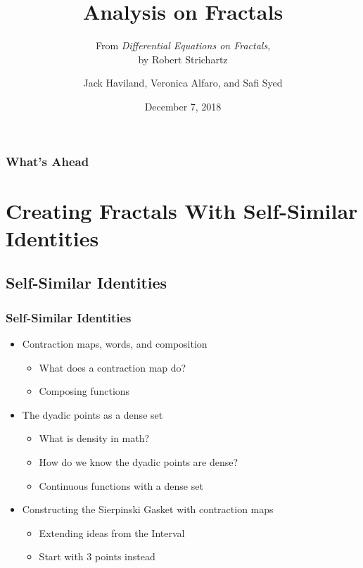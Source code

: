 \documentclass{beamer}
\title{Analysis on Fractals}
\subtitle{From \textit{Differential Equations on Fractals}, \\ by Robert Strichartz}
\author[Jack H, Veronica A, Safi S]{Jack Haviland, Veronica Alfaro, and Safi Syed}
\institute[]{Honors 135.004\\Fractals: Their Beauty and Topology\\Connor Davis}
\date{December 7, 2018}
\begin{document}
\begin{frame}
	\titlepage
\end{frame}

\begin{frame}
	\frametitle{What's Ahead}
	\tableofcontents
\end{frame}

\section{Creating Fractals With Self-Similar Identities}
\subsection{Self-Similar Identities}
\begin{frame}
	\frametitle{Self-Similar Identities}
	\begin{itemize}
		\item Contraction maps, words, and composition
			\begin{itemize}
					\item What does a contraction map do?
					\item Composing functions
			\end{itemize}
		\item The dyadic points as a dense set
			\begin{itemize}
				\item What is density in math?
				\item How do we know the dyadic points are dense?
				\item Continuous functions with a dense set
			\end{itemize}
		\item Constructing the Sierpinski Gasket with contraction maps
			\begin{itemize}
				\item Extending ideas from the Interval
				\item Start with 3 points instead
			\end{itemize}
	\end{itemize}
\end{frame}
\end{document}

